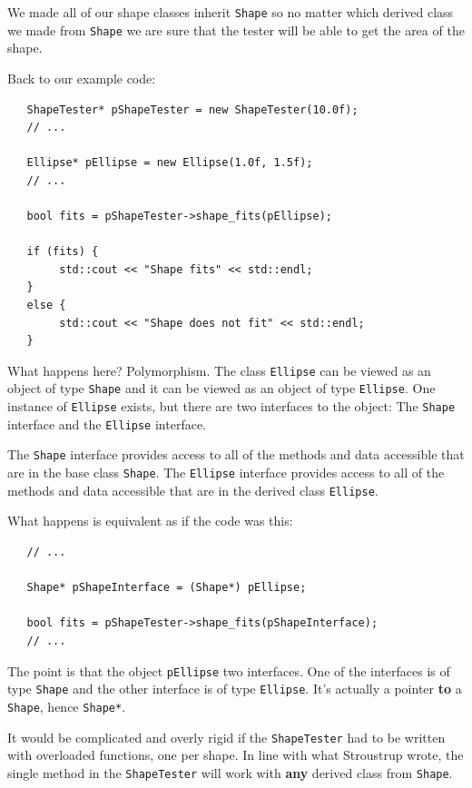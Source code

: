\documentclass[12pt]{article}
\begin{document}
\begin{enumerate}
\begin{enumerate}
We made all of our shape classes inherit {\texttt{Shape}} so
no matter which derived class we made from {\texttt{Shape}} we are
sure that the tester will be able to get the area of the shape.

Back to our example code:

\begin{lstlisting}
   ShapeTester* pShapeTester = new ShapeTester(10.0f);
   // ...

   Ellipse* pEllipse = new Ellipse(1.0f, 1.5f);
   // ...

   bool fits = pShapeTester->shape_fits(pEllipse);

   if (fits) {
        std::cout << "Shape fits" << std::endl;
   }
   else {
        std::cout << "Shape does not fit" << std::endl;
   }
\end{lstlisting}


What happens here? Polymorphism.  The class {\texttt{Ellipse}} can be
viewed as an object of type {\texttt{Shape}} and it can be viewed
as an object of type {\texttt{Ellipse}}.   One instance of 
{\texttt{Ellipse}} exists, but there are two interfaces to the object:
The {\texttt{Shape}} interface and the {\texttt{Ellipse}} interface.

\par
The {\texttt{Shape}} interface provides access to all of the methods
and data accessible that are in the base class {\texttt{Shape}}.
The {\texttt{Ellipse}} interface provides access to all of the
methods and data accessible that are in the derived class {\texttt{Ellipse}}.
\par 
What happens is equivalent as if the code was this:

\begin{lstlisting}
   // ...

   Shape* pShapeInterface = (Shape*) pEllipse;

   bool fits = pShapeTester->shape_fits(pShapeInterface);
   // ...
\end{lstlisting}

The point is that the object {\texttt{pEllipse}} two interfaces.
One of the interfaces is of type {\texttt{Shape}} and the other interface
is of type {\texttt{Ellipse}}.  It's actually a pointer {\textbf{to}}
a {\texttt{Shape}}, hence {\texttt{Shape*}}.
\par
It would be complicated and overly rigid if the {\texttt{ShapeTester}}
had to be written with overloaded functions, one per shape.  In line
with what Stroustrup wrote, the single method in the {\texttt{ShapeTester}}
will work with {\textbf{any}} derived class from {\texttt{Shape}}.
\par


\end{enumerate}
\end{enumerate}
\end{document}
